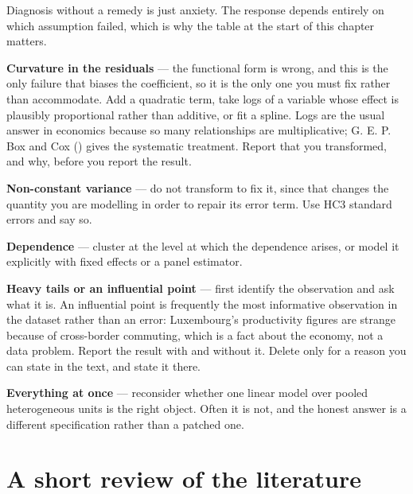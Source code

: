 \documentclass[
  letterpaper,
  10pt,
  twoside,
  openright,
  numbers=noenddot,
  chapterprefix=true]{scrbook}
\begin{document}
Diagnosis without a remedy is just anxiety. The response depends
entirely on which assumption failed, which is why the table at the start
of this chapter matters.

\textbf{Curvature in the residuals} --- the functional form is wrong,
and this is the only failure that biases the coefficient, so it is the
only one you must fix rather than accommodate. Add a quadratic term,
take logs of a variable whose effect is plausibly proportional rather
than additive, or fit a spline. Logs are the usual answer in economics
because so many relationships are multiplicative; G. E. P. Box and Cox
() gives the systematic treatment. Report
that you transformed, and why, before you report the result.

\textbf{Non-constant variance} --- do not transform to fix it, since
that changes the quantity you are modelling in order to repair its error
term. Use HC3 standard errors and say so.

\textbf{Dependence} --- cluster at the level at which the dependence
arises, or model it explicitly with fixed effects or a panel estimator.

\textbf{Heavy tails or an influential point} --- first identify the
observation and ask what it is. An influential point is frequently the
most informative observation in the dataset rather than an error:
Luxembourg's productivity figures are strange because of cross-border
commuting, which is a fact about the economy, not a data problem. Report
the result with and without it. Delete only for a reason you can state
in the text, and state it there.

\textbf{Everything at once} --- reconsider whether one linear model over
pooled heterogeneous units is the right object. Often it is not, and the
honest answer is a different specification rather than a patched one.

\section{A short review of the
literature}\label{a-short-review-of-the-literature-1}
\end{document}
